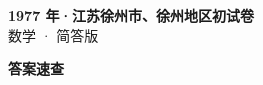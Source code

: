 \documentclass[zihao=-4, a4paper]{ctexart}
\begin{document}
\begin{center}
  {\Large\bfseries 1977 年·江苏徐州市、徐州地区初试卷}\\[4pt]
  {\large 数学 · 简答版}
\end{center}
\medskip
{}

\clearpage
{}
\begin{center}{\Large\bfseries 答案速查}\end{center}
\medskip

\end{document}
